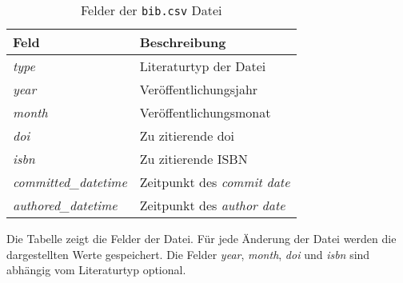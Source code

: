 \begin{table}
    \begin{tabularx}{\textwidth}{XL{10.2cm}}
        \toprule
        \textbf{Feld}              & \textbf{Beschreibung}                  \\ \midrule
        \emph{type}                & Literaturtyp der  Datei \\
        \emph{year}                & Veröffentlichungsjahr                  \\
        \emph{month}               & Veröffentlichungsmonat                 \\
        \emph{doi}                 & Zu zitierende \gls{doi}                \\
        \emph{isbn}                & Zu zitierende ISBN                     \\
        \emph{committed\_datetime} & Zeitpunkt des \emph{commit date}       \\
        \emph{authored\_datetime}  & Zeitpunkt des \emph{author date}       \\
        \bottomrule
    \end{tabularx}
    \caption{Felder der \texttt{bib.csv} Datei}
    \label{tab:bib}
    \small
    Die Tabelle zeigt die Felder der  Datei. Für jede Änderung der  Datei werden die dargestellten Werte gespeichert. Die Felder \emph{year}, \emph{month}, \emph{doi} und \emph{isbn} sind abhängig vom Literaturtyp optional.
\end{table}
